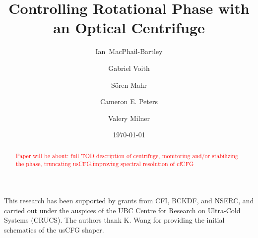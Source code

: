 \documentclass[aip,twocolumn]{revtex4-2}
\begin{document}
\title{Controlling Rotational Phase with an Optical Centrifuge}
\author{Ian~MacPhail-Bartley}
\author{Gabriel Voith}
\author{S{\"o}ren Mahr}
\author{Cameron E. Peters}
\author{Valery Milner}


\date{\today}

\begin{abstract}
\textcolor{red}{Paper will be about: full TOD description of centrifuge, monitoring and/or stabilizing the phase, truncating usCFG,improving spectral resolution of cfCFG }

\end{abstract}

\maketitle














\begin{acknowledgments}
This research has been supported by grants from CFI, BCKDF, and NSERC, and carried out under the auspices of the UBC Centre for Research on Ultra-Cold Systems (CRUCS). The authors thank K. Wang for providing the initial schematics of the usCFG shaper. 
\end{acknowledgments}

\end{document}
